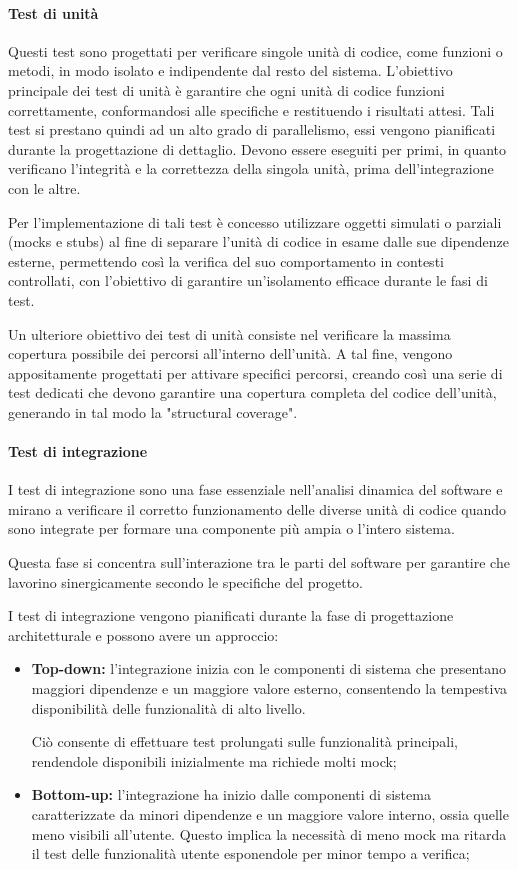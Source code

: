 \paragraph{Test di unità}
Questi test sono progettati per verificare singole unità di codice, come funzioni o metodi, in modo isolato e indipendente dal resto del sistema. L'obiettivo principale dei test di unità è garantire che ogni unità di codice funzioni correttamente, conformandosi alle specifiche e restituendo i risultati attesi.
Tali test si prestano quindi ad un alto grado di parallelismo, essi vengono pianificati durante la progettazione di dettaglio.
Devono essere eseguiti per primi, in quanto verificano l’integrità e la correttezza della singola unità, prima dell’integrazione con le altre. 

Per l'implementazione di tali test è concesso utilizzare oggetti simulati o parziali (mocks e stubs) al fine di separare l'unità di codice in esame dalle sue dipendenze esterne, permettendo così la verifica del suo comportamento in contesti controllati, con l'obiettivo di garantire un'isolamento efficace durante le fasi di test. 

Un ulteriore obiettivo dei test di unità consiste nel verificare la massima copertura possibile dei percorsi all'interno dell'unità. A tal fine, vengono appositamente progettati per attivare specifici percorsi, creando così una serie di test dedicati che devono garantire una copertura completa del codice dell'unità, generando in tal modo la "structural coverage".
 
\paragraph{Test di integrazione}
I test di integrazione sono una fase essenziale nell'analisi dinamica del software e mirano a verificare il corretto funzionamento delle diverse unità di codice quando sono integrate per formare una componente più ampia o l'intero sistema. 

Questa fase si concentra sull'interazione tra le parti del software per garantire che lavorino sinergicamente secondo le specifiche del progetto.

I test di integrazione vengono pianificati durante la fase di progettazione architetturale e possono avere un approccio: 

\begin{itemize}
    \item \textbf{Top-down:}
        l'integrazione inizia con le componenti di sistema che presentano maggiori dipendenze e un maggiore valore esterno, consentendo la tempestiva disponibilità delle funzionalità di alto livello.

        Ciò consente di effettuare test prolungati sulle funzionalità principali, rendendole disponibili inizialmente ma richiede molti mock; 
    \item \textbf{Bottom-up:}
        l'integrazione ha inizio dalle componenti di sistema caratterizzate da minori dipendenze e un maggiore valore interno, ossia quelle meno visibili all'utente. Questo implica la necessità di meno mock ma ritarda il test delle funzionalità utente esponendole per minor tempo a verifica; 
\end{itemize}


